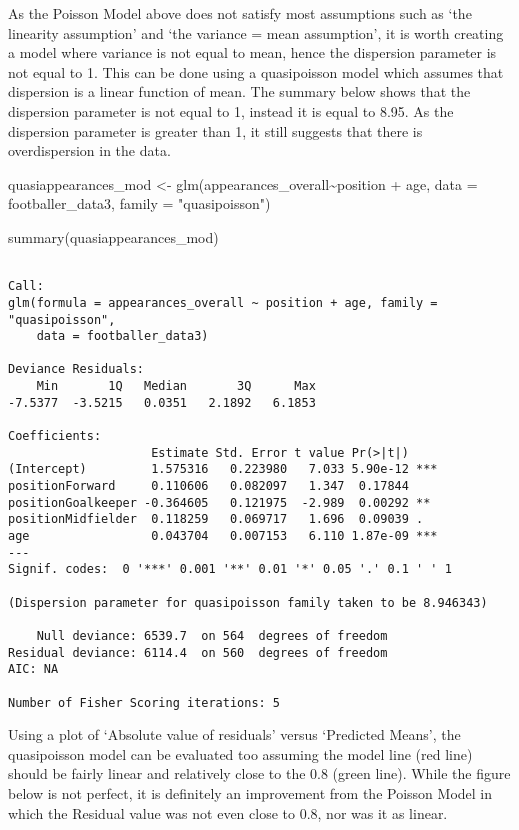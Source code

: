 \documentclass[
]{article}
\newenvironment{Shaded}{\begin{snugshade}}{\end{snugshade}}
\newcommand{\AttributeTok}[1]{\textcolor[rgb]{0.77,0.63,0.00}{#1}}
\newcommand{\FunctionTok}[1]{\textcolor[rgb]{0.00,0.00,0.00}{#1}}
\newcommand{\NormalTok}[1]{#1}
\newcommand{\OtherTok}[1]{\textcolor[rgb]{0.56,0.35,0.01}{#1}}
\newcommand{\SpecialCharTok}[1]{\textcolor[rgb]{0.00,0.00,0.00}{#1}}
\newcommand{\StringTok}[1]{\textcolor[rgb]{0.31,0.60,0.02}{#1}}
\begin{document}
As the Poisson Model above does not satisfy most assumptions such as
`the linearity assumption' and `the variance = mean assumption', it is
worth creating a model where variance is not equal to mean, hence the
dispersion parameter is not equal to 1. This can be done using a
quasipoisson model which assumes that dispersion is a linear function of
mean. The summary below shows that the dispersion parameter is not equal
to 1, instead it is equal to 8.95. As the dispersion parameter is
greater than 1, it still suggests that there is overdispersion in the
data.

\begin{Shaded}
\begin{Highlighting}[]
\NormalTok{quasiappearances\_mod }\OtherTok{\textless{}{-}}
  \FunctionTok{glm}\NormalTok{(appearances\_overall}\SpecialCharTok{\textasciitilde{}}\NormalTok{position }\SpecialCharTok{+}\NormalTok{ age, }\AttributeTok{data =}\NormalTok{ footballer\_data3, }\AttributeTok{family =} \StringTok{"quasipoisson"}\NormalTok{)}

\FunctionTok{summary}\NormalTok{(quasiappearances\_mod)}
\end{Highlighting}
\end{Shaded}

\begin{verbatim}

Call:
glm(formula = appearances_overall ~ position + age, family = "quasipoisson", 
    data = footballer_data3)

Deviance Residuals: 
    Min       1Q   Median       3Q      Max  
-7.5377  -3.5215   0.0351   2.1892   6.1853  

Coefficients:
                    Estimate Std. Error t value Pr(>|t|)    
(Intercept)         1.575316   0.223980   7.033 5.90e-12 ***
positionForward     0.110606   0.082097   1.347  0.17844    
positionGoalkeeper -0.364605   0.121975  -2.989  0.00292 ** 
positionMidfielder  0.118259   0.069717   1.696  0.09039 .  
age                 0.043704   0.007153   6.110 1.87e-09 ***
---
Signif. codes:  0 '***' 0.001 '**' 0.01 '*' 0.05 '.' 0.1 ' ' 1

(Dispersion parameter for quasipoisson family taken to be 8.946343)

    Null deviance: 6539.7  on 564  degrees of freedom
Residual deviance: 6114.4  on 560  degrees of freedom
AIC: NA

Number of Fisher Scoring iterations: 5
\end{verbatim}

Using a plot of `Absolute value of residuals' versus `Predicted Means',
the quasipoisson model can be evaluated too assuming the model line (red
line) should be fairly linear and relatively close to the 0.8 (green
line). While the figure below is not perfect, it is definitely an
improvement from the Poisson Model in which the Residual value was not
even close to 0.8, nor was it as linear.
\end{document}
